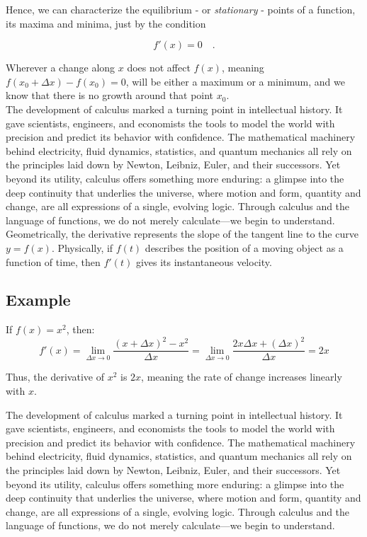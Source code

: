 \documentclass{book}
\begin{document}
Hence, we can characterize the equilibrium - or \textit{stationary} - points of a function, its maxima and minima, just by the condition

\begin{equation}
	f'(x) = 0 \quad .
\end{equation}

Wherever a change along $x$ does not affect $f(x)$, meaning $f(x_0 + \Delta x) - f(x_0) = 0$, will be either a maximum or a minimum, and we know that there is no growth around that point $x_0$.\\

The development of calculus marked a turning point in intellectual history. It gave scientists, engineers, and economists the tools to model the world with precision and predict its behavior with confidence. The mathematical machinery behind electricity, fluid dynamics, statistics, and quantum mechanics all rely on the principles laid down by Newton, Leibniz, Euler, and their successors. Yet beyond its utility, calculus offers something more enduring: a glimpse into the deep continuity that underlies the universe, where motion and form, quantity and change, are all expressions of a single, evolving logic. Through calculus and the language of functions, we do not merely calculate---we begin to understand.\\

Geometrically, the derivative represents the slope of the tangent line to the curve \( y = f(x) \). Physically, if \( f(t) \) describes the position of a moving object as a function of time, then \( f'(t) \) gives its instantaneous velocity.

\subsection*{Example}

If \( f(x) = x^2 \), then:
\[
f'(x) = \lim_{\Delta x \to 0} \frac{(x + \Delta x)^2 - x^2}{\Delta x}
= \lim_{\Delta x \to 0} \frac{2x\Delta x + (\Delta x)^2}{\Delta x}
= 2x
\]

Thus, the derivative of \( x^2 \) is \( 2x \), meaning the rate of change increases linearly with \( x \).

The development of calculus marked a turning point in intellectual history. It gave scientists, engineers, and economists the tools to model the world with precision and predict its behavior with confidence. The mathematical machinery behind electricity, fluid dynamics, statistics, and quantum mechanics all rely on the principles laid down by Newton, Leibniz, Euler, and their successors. Yet beyond its utility, calculus offers something more enduring: a glimpse into the deep continuity that underlies the universe, where motion and form, quantity and change, are all expressions of a single, evolving logic. Through calculus and the language of functions, we do not merely calculate---we begin to understand.\\
\end{document}
